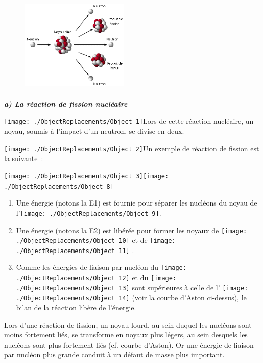 \begin{figure}
\centering
\includegraphics[width=5.131cm,height=4.584cm]{Pictures/100000010000013B00000106ADCB5679C9DC9F10.gif}
\caption{}
\end{figure}

\emph{\textbf{a) La réaction de fission nucléaire}}

\texttt{[image: ./ObjectReplacements/Object 1]}Lors
de cette réaction nucléaire, un noyau, soumis à l'impact d'un neutron,
se divise en deux.

\texttt{[image: ./ObjectReplacements/Object 2]}Un
exemple de réaction de fission est la suivante~:

\texttt{[image: ./ObjectReplacements/Object 3]}\texttt{[image: ./ObjectReplacements/Object 8]}

\begin{enumerate}
\def\labelenumi{\arabic{enumi})}
\tightlist
\item
  Une énergie (notons la E1) est fournie pour séparer les nucléons du
  noyau de
  l'\texttt{[image: ./ObjectReplacements/Object 9]}.
\item
  Une énergie (notons la E2) est libérée pour former les noyaux de
  \texttt{[image: ./ObjectReplacements/Object 10]}
  et de
  \texttt{[image: ./ObjectReplacements/Object 11]}
  .
\item
  Comme les énergies de liaison par nucléon du
  \texttt{[image: ./ObjectReplacements/Object 12]}
  et du
  \texttt{[image: ./ObjectReplacements/Object 13]}
  sont supérieures à celle de l'
  \texttt{[image: ./ObjectReplacements/Object 14]}
  (voir la courbe d'Aston ci-dessus), le bilan de la réaction libère de
  l'énergie.
\end{enumerate}

\protect\hypertarget{anchor}{}{}

Lors d'une réaction de fission, un noyau lourd, au sein duquel les
nucléons sont moins fortement liés, se transforme en noyaux plus légers,
au sein desquels les nucléons sont plus fortement liés (cf. courbe
d'Aston). Or une énergie de liaison par nucléon plus grande conduit à un
défaut de masse plus important.

